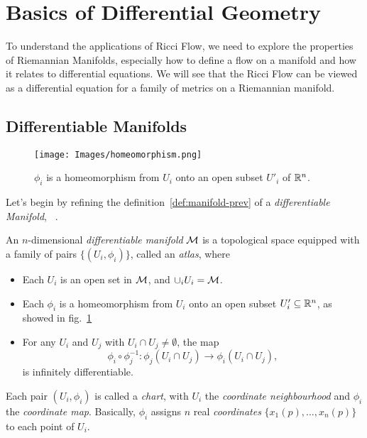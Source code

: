 \section{Basics of Differential Geometry}
To understand the applications of Ricci Flow, we need to explore the properties of Riemannian Manifolds, especially how to define a flow on a manifold and how it relates to differential equations. We will see that the Ricci Flow can be viewed as a differential equation for a family of metrics on a Riemannian manifold.


\subsection{Differentiable Manifolds}
\begin{figure}
    \centering
    \texttt{[image: Images/homeomorphism.png]}
    \caption{$\phi_i$ is a homeomorphism from $U_i$ onto an open subset $U'_i$ of $\mathbb{R}^n$.}
    \label{fig:homeomorphism}
\end{figure}

Let's begin by refining the definition~\ref{def:manifold-prev} of a \emph{differentiable Manifold}, ~\cite{lee:smooth,tu:manifolds}.

\begin{definition}
    An $n$-dimensional \emph{differentiable manifold} $\mathcal{M}$ is a topological space equipped with a family of pairs $\{ (U_i, \phi_i) \}$, called an \emph{atlas}, where
    \begin{itemize}
        \item Each $U_i$ is an open set in $\mathcal{M}$, and $\cup_i U_i = \mathcal{M}$. 
        \item Each $\phi_i$ is a homeomorphism from $U_i$ onto an open subset $U_i'\subseteq \mathbb{R}^n$, as showed in fig.~\ref{fig:homeomorphism}
        \item For any $U_i$ and $U_j$ with $U_i \cap U_j \neq \emptyset$, the map 
        \begin{equation*}
            \phi_i \circ \phi_j^{-1} \colon \phi_j (U_i \cap U_j) \to \phi_i(U_i \cap U_j),
        \end{equation*}
        is infinitely differentiable.
    \end{itemize}
\end{definition}

Each pair $(U_i, \phi_i)$ is called a \emph{chart}, with $U_i$ the \emph{coordinate neighbourhood} and $\phi_i$ the \emph{coordinate map}. Basically, $\phi_i$ assigns $n$ real \emph{coordinates} $\{x_1(p), \dots, x_n(p)\}$ to each point of $U_i$.

